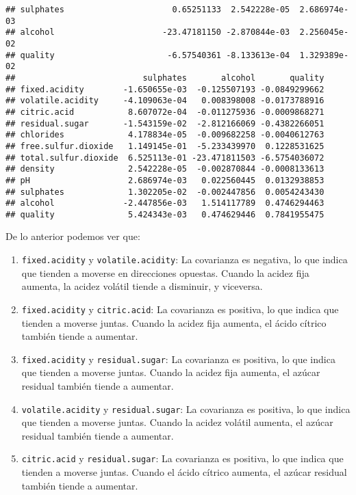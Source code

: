 \documentclass[
]{article}
\begin{document}
\begin{verbatim}
## sulphates                      0.65251133  2.542228e-05  2.686974e-03
## alcohol                      -23.47181150 -2.870844e-03  2.256045e-02
## quality                       -6.57540361 -8.133613e-04  1.329389e-02
##                          sulphates       alcohol       quality
## fixed.acidity        -1.650655e-03  -0.125507193 -0.0849299662
## volatile.acidity     -4.109063e-04   0.008398008 -0.0173788916
## citric.acid           8.607072e-04  -0.011275936 -0.0009868271
## residual.sugar       -1.543159e-02  -2.812166069 -0.4382266051
## chlorides             4.178834e-05  -0.009682258 -0.0040612763
## free.sulfur.dioxide   1.149145e-01  -5.233439970  0.1228531625
## total.sulfur.dioxide  6.525113e-01 -23.471811503 -6.5754036072
## density               2.542228e-05  -0.002870844 -0.0008133613
## pH                    2.686974e-03   0.022560445  0.0132938853
## sulphates             1.302205e-02  -0.002447856  0.0054243430
## alcohol              -2.447856e-03   1.514117789  0.4746294463
## quality               5.424343e-03   0.474629446  0.7841955475
\end{verbatim}

De lo anterior podemos ver que:

\begin{enumerate}
\def\labelenumi{\arabic{enumi}.}
\item
  \texttt{fixed.acidity} y \texttt{volatile.acidity}: La covarianza es
  negativa, lo que indica que tienden a moverse en direcciones opuestas.
  Cuando la acidez fija aumenta, la acidez volátil tiende a disminuir, y
  viceversa.
\item
  \texttt{fixed.acidity} y \texttt{citric.acid}: La covarianza es
  positiva, lo que indica que tienden a moverse juntas. Cuando la acidez
  fija aumenta, el ácido cítrico también tiende a aumentar.
\item
  \texttt{fixed.acidity} y \texttt{residual.sugar}: La covarianza es
  positiva, lo que indica que tienden a moverse juntas. Cuando la acidez
  fija aumenta, el azúcar residual también tiende a aumentar.
\item
  \texttt{volatile.acidity} y \texttt{residual.sugar}: La covarianza es
  positiva, lo que indica que tienden a moverse juntas. Cuando la acidez
  volátil aumenta, el azúcar residual también tiende a aumentar.
\item
  \texttt{citric.acid} y \texttt{residual.sugar}: La covarianza es
  positiva, lo que indica que tienden a moverse juntas. Cuando el ácido
  cítrico aumenta, el azúcar residual también tiende a aumentar.
\end{enumerate}
\end{document}
